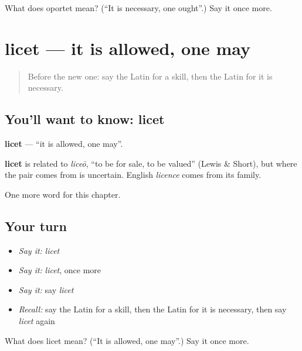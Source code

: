 \begin{tcolorbox}[breakable,colback=teal!4,colframe=teal!35!black,title={Before you move on}]
What does oportet mean? (\textquotedblleft{}It is necessary, one ought\textquotedblright{}.) Say it once more.
\end{tcolorbox}
\section[licet]{licet — it is allowed, one may}

\label{lesson:LA-C110-licet}



\begin{quote}
Before the new one: say the Latin for a skill, then the Latin for it is necessary.
\end{quote}

\subsection*{You'll want to know: licet}
\textbf{licet} — \textquotedblleft{}it is allowed, one may\textquotedblright{}.

\begin{cousinweb}
\textbf{licet} is related to \emph{liceō}, \textquotedblleft{}to be for sale, to be valued\textquotedblright{} (Lewis \& Short), but where the pair comes from is uncertain. English \emph{licence} comes from its family.
\end{cousinweb}

\begin{grammarlens}[title={What you've built}]
One more word for this chapter.
\end{grammarlens}

\subsection*{Your turn}
\begin{itemize}
\raggedright
  \item \emph{Say it:} \emph{licet}
  \item \emph{Say it:} \emph{licet}, once more
  \item \emph{Say it:} say \emph{licet}
  \item \emph{Recall:} say the Latin for a skill, then the Latin for it is necessary, then say \emph{licet} again
\end{itemize}

\begin{tcolorbox}[breakable,colback=teal!4,colframe=teal!35!black,title={Before you move on}]
What does licet mean? (\textquotedblleft{}It is allowed, one may\textquotedblright{}.) Say it once more.
\end{tcolorbox}
